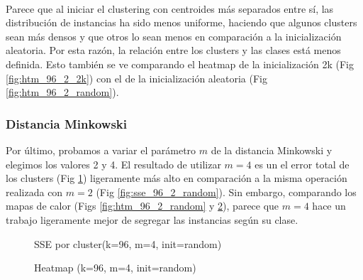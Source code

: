 \documentclass[10pt,a4paper]{article}
\begin{document}
	\paragraph{}
	Parece que al iniciar el clustering con centroides más separados entre sí, las distribución de instancias ha sido menos uniforme, haciendo que algunos clusters sean más densos y que otros lo sean menos en comparación a la inicialización aleatoria. Por esta razón, la relación entre los clusters y las clases está menos definida. Esto también se ve comparando el heatmap de la inicialización 2k (Fig \ref{fig:htm_96_2_2k}) con el de la inicialización aleatoria (Fig \ref{fig:htm_96_2_random}).
	
	\subsubsection{Distancia Minkowski}
	Por último, probamos a variar el parámetro $m$ de la distancia Minkowski y elegimos los valores 2 y 4. El resultado de utilizar $m=4$ es un el error total de los clusters (Fig \ref{fig:sse_96_4_random}) ligeramente más alto en comparación a la misma operación realizada con $m=2$ (Fig \ref{fig:sse_96_2_random}). Sin embargo, comparando los mapas de calor (Figs \ref{fig:htm_96_2_random} y \ref{fig:htm_96_4_random}), parece que $m=4$ hace un trabajo ligeramente mejor de segregar las instancias según su clase.
	
	\begin{figure}
		\centering
		\caption{SSE por cluster(k=96, m=4, init=random)}
		\label{fig:sse_96_4_random}
	\end{figure}	
	\begin{figure}
		\centering
		\caption{Heatmap (k=96, m=4, init=random)}
		\label{fig:htm_96_4_random}
	\end{figure}
	
\end{document}
